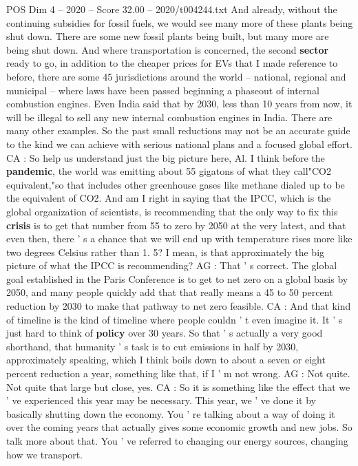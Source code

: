 \begin{textsample}{POS Dim 4 – 2020 – Score 32.00 – 2020/t004244.txt}
And already, without the continuing subsidies for fossil fuels, we would see many more of these plants being shut down.
There are some new fossil plants being built, but many more are being shut down.
And where transportation is concerned, the second \textbf{sector} ready to go, in addition to the cheaper prices for EVs that I made reference to before, there are some 45 jurisdictions around the world -- national, regional and municipal -- where laws have been passed beginning a phaseout of internal combustion engines.
Even India said that by 2030, less than 10 years from now, it will be illegal to sell any new internal combustion engines in India.
There are many other examples.
So the past small reductions may not be an accurate guide to the kind we can achieve with serious national plans and a focused global effort.
CA : So help us understand just the big picture here, Al.
I think before the \textbf{pandemic}, the world was emitting about 55 gigatons of what they call"CO2 equivalent,"so that includes other greenhouse gases like methane dialed up to be the equivalent of CO2.
And am I right in saying that the IPCC, which is the global organization of scientists, is recommending that the only way to fix this \textbf{crisis} is to get that number from 55 to zero by 2050 at the very latest, and that even then, there ' s a chance that we will end up with temperature rises more like two degrees Celsius rather than 1. 5?
I mean, is that approximately the big picture of what the IPCC is recommending?
AG : That ' s correct.
The global goal established in the Paris Conference is to get to net zero on a global basis by 2050, and many people quickly add that that really means a 45 to 50 percent reduction by 2030 to make that pathway to net zero feasible.
CA : And that kind of timeline is the kind of timeline where people couldn ' t even imagine it.
It ' s just hard to think of \textbf{policy} over 30 years.
So that ' s actually a very good shorthand, that humanity ' s task is to cut emissions in half by 2030, approximately speaking, which I think boils down to about a seven or eight percent reduction a year, something like that, if I ' m not wrong.
AG : Not quite.
Not quite that large but close, yes.
CA : So it is something like the effect that we ' ve experienced this year may be necessary.
This year, we ' ve done it by basically shutting down the economy.
You ' re talking about a way of doing it over the coming years that actually gives some economic growth and new jobs.
So talk more about that.
You ' ve referred to changing our energy sources, changing how we transport.

\end{textsample}
